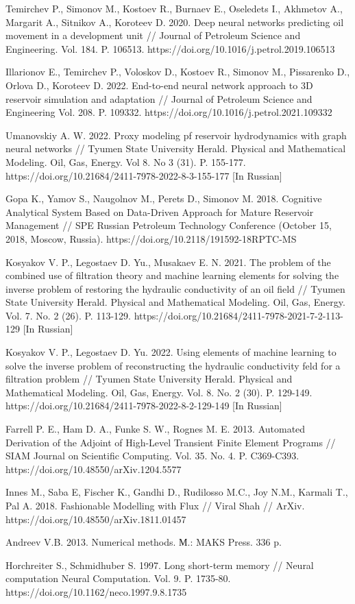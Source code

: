 \documentclass{article}
\begin{document}
\begin{thebibliography}{20}
 Temirchev P., Simonov M., Kostoev R., Burnaev E., Oseledets I., Akhmetov A., Margarit A., Sitnikov A., Koroteev D. 2020. Deep neural networks predicting oil movement in a development unit // Journal of Petroleum Science and Engineering. Vol. 184. P. 106513. https://doi.org/10.1016/j.petrol.2019.106513

 Illarionov E., Temirchev P., Voloskov D., Kostoev R., Simonov M., Pissarenko D., Orlova D., Koroteev D. 2022. End-to-end neural network approach to 3D reservoir simulation and adaptation // Journal of Petroleum Science and Engineering Vol. 208. P. 109332. https://doi.org/10.1016/j.petrol.2021.109332

 Umanovskiy A. W. 2022. Proxy modeling pf reservoir hydrodynamics with graph neural networks // Tyumen State University Herald. Physical and Mathematical Modeling. Oil, Gas, Energy. Vol 8. No 3 (31). P. 155-177. https://doi.org/10.21684/2411-7978-2022-8-3-155-177 [In Russian]

 Gopa K., Yamov S., Naugolnov M., Perets D., Simonov M. 2018. Cognitive Analytical System Based on Data-Driven Approach for Mature Reservoir Management // SPE Russian Petroleum Technology Conference (October 15, 2018, Moscow, Russia). https://doi.org/10.2118/191592-18RPTC-MS

 Kosyakov V. P., Legostaev D. Yu., Musakaev E. N. 2021. The problem of the combined use of filtration theory and machine learning elements for solving the inverse problem of restoring the hydraulic conductivity of an oil field // Tyumen State University Herald. Physical and Mathematical Modeling. Oil, Gas, Energy. Vol. 7. No. 2 (26). P. 113-129. https://doi.org/10.21684/2411-7978-2021-7-2-113-129 [In Russian]

 Kosyakov V. P., Legostaev D. Yu. 2022. Using elements of machine learning to solve the inverse problem of reconstructing the hydraulic conductivity feld for a filtration problem // Tyumen State University Herald. Physical and Mathematical Modeling. Oil, Gas, Energy. Vol. 8. No. 2 (30). P. 129-149. https://doi.org/10.21684/2411-7978-2022-8-2-129-149 [In Russian]

 Farrell P. E., Ham D. A., Funke S. W., Rognes M. E. 2013. Automated Derivation of the Adjoint of High-Level Transient Finite Element Programs // SIAM Journal on Scientific Computing. Vol. 35. No. 4. P. C369-C393. https://doi.org/10.48550/arXiv.1204.5577

 Innes M.,  Saba E, Fischer K., Gandhi D., Rudilosso M.C., Joy N.M., Karmali T., Pal A. 2018. Fashionable Modelling with Flux // Viral Shah // ArXiv. https://doi.org/10.48550/arXiv.1811.01457 

 Andreev V.B. 2013. Numerical methods. М.: MAKS Press. 336 p.

 Horchreiter S., Schmidhuber S. 1997. Long short-term memory // Neural computation Neural Computation. Vol. 9. P. 1735-80. https://doi.org/10.1162/neco.1997.9.8.1735

\end{thebibliography}
\end{document}
